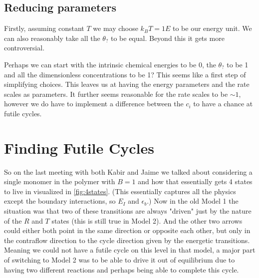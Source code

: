 \documentclass[11pt]{article}
\begin{document}
\subsection{Reducing parameters}
Firstly, assuming constant $T$ we may choose $\si{k_B}T = 1\si{E}$ to be our energy unit.
We can also reasonably take all the $\theta_?$ to be equal.
Beyond this it gets more controversial.

Perhaps we can start with the intrinsic chemical energies to be 0, the $\theta_?$ to be 1 and all the dimensionless concentrations to be 1?
This seems like a first step of simplifying choices.
This leaves us at having the energy parameters and the rate scales as parameters.
It further seems reasonable for the rate scales to be ${\sim}1$, however we do have to implement a difference between the $c_i$ to have a chance at futile cycles.


\section{Finding Futile Cycles}
So on the last meeting with both Kabir and Jaime we talked about considering a single monomer in the polymer with $B=1$ and how that essentially gets 4 states to live in visualized in \cref{fig:4states}.
(This essentially captures all the physics except the boundary interactions, so $E_I$ and $\epsilon_b$.)
Now in the old Model 1 the situation was that two of these transitions are always "driven" just by the nature of the $R$ and $T$ states (this is still true in Model 2).
And the other two arrows could either both point in the same direction or opposite each other, but only in the contraflow direction to the cycle direction given by the energetic transitions.
Meaning we could not have a futile cycle on this level in that model, a major part of switching to Model 2 was to be able to drive it out of equilibrium due to having two different reactions and perhaps being able to complete this cycle.
\end{document}
